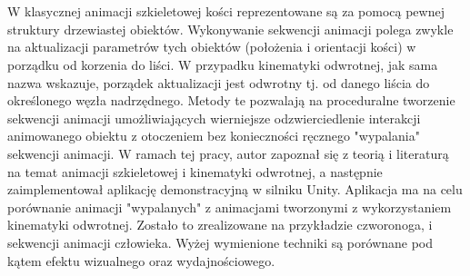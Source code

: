 \documentclass[oneside,12pt]{wipb}
\begin{document}
\maketitle
\chapter*{}
W klasycznej animacji szkieletowej kości reprezentowane są za pomocą pewnej
struktury drzewiastej obiektów. Wykonywanie sekwencji animacji polega zwykle na
aktualizacji parametrów tych obiektów (położenia i orientacji kości) w porządku
od korzenia do liści. W przypadku kinematyki odwrotnej, jak sama nazwa wskazuje,
porządek aktualizacji jest odwrotny tj. od danego liścia do określonego węzła
nadrzędnego. Metody te pozwalają na proceduralne tworzenie sekwencji animacji
umożliwiających wierniejsze odzwierciedlenie interakcji animowanego obiektu
z otoczeniem bez konieczności ręcznego "wypalania" sekwencji animacji. W ramach
tej pracy, autor zapoznał się z teorią i literaturą na temat animacji
szkieletowej i kinematyki odwrotnej, a następnie zaimplementował aplikację
demonstracyjną w silniku Unity. Aplikacja ma na celu porównanie animacji
"wypalanych" z animacjami tworzonymi z wykorzystaniem kinematyki odwrotnej.
Zostało to zrealizowane na przykładzie czworonoga, i sekwencji animacji
człowieka. Wyżej wymienione techniki są porównane pod kątem efektu wizualnego
oraz wydajnościowego. 

\tableofcontents
\thispagestyle{empty}
\setcounter{page}{0}
\pagestyle{plain}








%

\listoffigures
\listoftables
\end{document}
